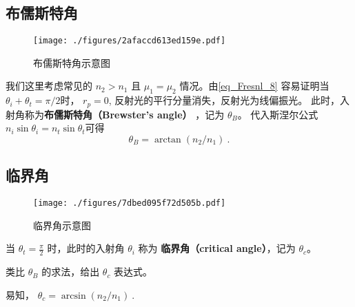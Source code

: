 \subsection{布儒斯特角}
\begin{figure}[ht]
\centering
\texttt{[image: ./figures/2afaccd613ed159e.pdf]}
\caption{布儒斯特角示意图} \label{fig_Fresnl_2}
\end{figure}
我们这里考虑常见的 $n_2>n_1$ 且 $\mu_1 = \mu_2$ 情况。由\autoref{eq_Fresnl_8} 容易证明当 $\theta_i + \theta_t = \pi/2$时， $r_p = 0$, 反射光的平行分量消失，反射光为线偏振光。 此时，入射角称为\textbf{布儒斯特角（Brewster's angle）} ，记为 $\theta_B$。 代入斯涅尔公式 $n_i\sin\theta_i = n_t\sin\theta_t$可得
\begin{equation}
\theta_B = \arctan (n_2/n_1)~.
\end{equation}

\subsection{临界角}
\begin{figure}[ht]
\centering
\texttt{[image: ./figures/7dbed095f72d505b.pdf]}
\caption{临界角示意图} \label{fig_Fresnl_3}
\end{figure}
\begin{definition}{}
当 $\theta_t  = \frac{\pi}{2}$ 时，此时的入射角 $\theta_i$ 称为 \textbf{临界角（critical angle）}，记为 $\theta_c$。
\end{definition}

\begin{exercise}{}
类比 $\theta_B$ 的求法，给出 $\theta_c$ 表达式。
\end{exercise}

易知， $\theta_c = \arcsin(n_2/n_1)~.$



